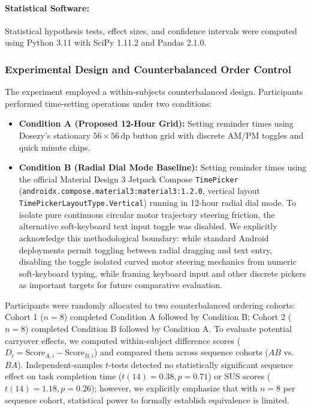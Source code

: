 \documentclass[11pt,a4paper]{article}
\begin{document}
\paragraph{Statistical Software:} Statistical hypothesis tests, effect sizes, and confidence intervals were computed using Python 3.11 with SciPy 1.11.2 and Pandas 2.1.0.

\subsubsection{Experimental Design and Counterbalanced Order Control}
The experiment employed a within-subjects counterbalanced design. Participants performed time-setting operations under two conditions:
\begin{itemize}[leftmargin=*]
    \item \textbf{Condition A (Proposed 12-Hour Grid):} Setting reminder times using Dosezy's stationary $56\times56\,\text{dp}$ button grid with discrete AM/PM toggles and quick minute chips.
    \item \textbf{Condition B (Radial Dial Mode Baseline):} Setting reminder times using the official Material Design 3 Jetpack Compose \texttt{TimePicker} (\texttt{androidx.compose.material3:material3:1.2.0}, vertical layout \texttt{TimePickerLayoutType.Vertical}) running in 12-hour radial dial mode. To isolate pure continuous circular motor trajectory steering friction, the alternative soft-keyboard text input toggle was disabled. We explicitly acknowledge this methodological boundary: while standard Android deployments permit toggling between radial dragging and text entry, disabling the toggle isolated curved motor steering mechanics from numeric soft-keyboard typing, while framing keyboard input and other discrete pickers as important targets for future comparative evaluation.
\end{itemize}

Participants were randomly allocated to two counterbalanced ordering cohorts: Cohort 1 ($n=8$) completed Condition A followed by Condition B; Cohort 2 ($n=8$) completed Condition B followed by Condition A. To evaluate potential carryover effects, we computed within-subject difference scores ($D_i = \text{Score}_{A,i} - \text{Score}_{B,i}$) and compared them across sequence cohorts ($AB$ vs.\ $BA$). Independent-samples $t$-tests detected no statistically significant sequence effect on task completion time ($t(14) = 0.38, p = 0.71$) or SUS scores ($t(14) = 1.18, p = 0.26$); however, we explicitly emphasize that with $n=8$ per sequence cohort, statistical power to formally establish equivalence is limited.
\end{document}
